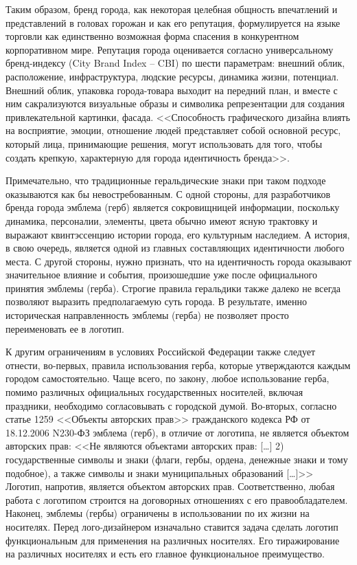 Таким образом, бренд города, как некоторая  целебная общность впечатлений и представлений в головах
горожан и как его репутация, формулируется на языке торговли  как единственно возможная форма
спасения в конкурентном корпоративном мире. Репутация города оценивается согласно универсальному
бренд-индексу (City Brand Index -- CBI) по шести параметрам: внешний облик, расположение,
инфраструктура, людские ресурсы, динамика жизни, потенциал. Внешний облик, упаковка города-товара
выходит на передний план,  и вместе с ним сакрализуются визуальные образы и символика репрезентации
для создания привлекательной картинки, фасада. <<Способность графического дизайна влиять на
восприятие, эмоции, отношение людей представляет собой основной ресурс, который лица, принимающие
решения, могут использовать для того, чтобы создать крепкую, характерную для города идентичность
бренда>>. \autocite[][267]{book:dinni}

Примечательно, что традиционные геральдические знаки при таком подходе оказываются как бы
невостребованным. С одной стороны, для разработчиков бренда города эмблема (герб) является
сокровищницей информации, поскольку динамика, персоналии, элементы, цвета обычно имеют ясную
трактовку и выражают квинтэссенцию истории города, его культурным наследием. А история, в свою
очередь, является одной из главных составляющих идентичности любого места. С другой стороны, нужно
признать, что на идентичность города оказывают значительное влияние и события, произошедшие уже
после официального принятия эмблемы (герба). Строгие правила геральдики также далеко не всегда
позволяют выразить предполагаемую суть города. В результате, именно историческая направленность
эмблемы (герба) не позволяет просто переименовать ее  в логотип.

К другим ограничениям в условиях Российской Федерации также следует отнести, во-первых, правила
использования герба, которые утверждаются каждым городом самостоятельно. Чаще всего, по закону,
любое использование герба, помимо различных официальных государственных носителей, включая
праздники, необходимо согласовывать с городской думой.  Во-вторых, согласно статье 1259 <<Объекты
авторских прав>> гражданского кодекса РФ от 18.12.2006 N230-ФЗ  эмблема (герб), в отличие от
логотипа, не является объектом авторских прав: <<Не являются объектами авторских прав: [\ldots] 2)
государственные символы и знаки (флаги, гербы, ордена, денежные знаки и тому подобное), а также
символы и знаки муниципальных образований [\ldots]>> Логотип,
напротив, является объектом авторских прав. Соответственно, любая работа с логотипом строится на
договорных отношениях с его правообладателем. Наконец, эмблемы (гербы) ограничены в использовании по
их жизни на носителях. Перед лого-дизайнером изначально ставится задача сделать логотип
функциональным для применения на различных носителях. Его тиражирование на различных носителях и
есть его главное функциональное преимущество.


